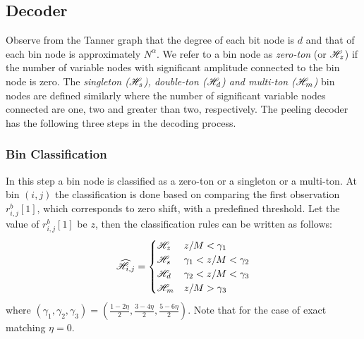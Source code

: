 \begin{enumerate}
\subsection{Decoder}		
	
	Observe from the Tanner graph that the degree of each bit node is $d$ and that of each bin node is approximately $N^{\alpha}$. 
We refer to a bin node as {\it zero-ton} (or $\mathscr{H}_z$) if the number of variable nodes with significant amplitude connected to the bin node is zero. The {\it singleton ($\mathscr{H}_s$), double-ton ($\mathscr{H}_d$) and multi-ton ($\mathscr{H}_m$)} bin nodes are defined similarly where the number of significant variable nodes connected are one, two and greater than two, respectively. The peeling decoder has the following three steps in the decoding process.\\

\subsubsection{Bin Classification} In this step a bin node is classified as a zero-ton or a singleton or a multi-ton. At bin $(i,j)$ the classification is done based on  comparing the first observation $r^{b}_{i,j}[1]$, which corresponds to zero shift, with a predefined threshold. Let the value of $r^{b}_{i,j}[1]$ be $z$, then the classification rules can be written as follows:\\
\begin{align}
\label{Eqn:BinClassifApprox}
\widehat{\mathscr{H}}_{i,j}=
\begin{cases}
\mathscr{H}_z &  	 z/M < \gamma_1\\
\mathscr{H}_s &	  \gamma_1 < z/M < \gamma_2  \\
\mathscr{H}_d  &    \gamma_2  < z/M <  \gamma_3\\ 
\mathscr{H}_m &      z/M > \gamma_3\\
\end{cases}
\end{align}
where $(\gamma_1,\gamma_2,\gamma_3)=(\frac{1-2\eta}{2},\frac{3-4\eta}{2},\frac{5-6\eta}{2})$. Note that for the case of exact matching $\eta=0$.
			   

\end{enumerate}
